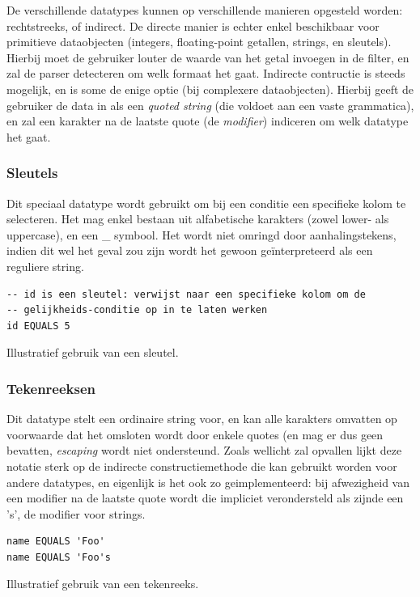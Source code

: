 De verschillende datatypes kunnen op verschillende manieren opgesteld worden: rechtstreeks, of indirect. De directe manier is echter enkel beschikbaar voor primitieve dataobjecten (integers, floating-point getallen, strings, en sleutels). Hierbij moet de gebruiker louter de waarde van het getal invoegen in de filter, en zal de parser detecteren om welk formaat het gaat.
Indirecte contructie is steeds mogelijk, en is some de enige optie (bij complexere dataobjecten). Hierbij geeft de gebruiker de data in als een \emph{quoted string} (die voldoet aan een vaste grammatica), en zal een karakter na de laatste quote (de \emph{modifier}) indiceren om welk datatype het gaat.

\subsubsection{Sleutels}

Dit speciaal datatype wordt gebruikt om bij een conditie een specifieke kolom te selecteren. Het mag enkel bestaan uit alfabetische karakters (zowel lower- als uppercase), en een \_ symbool. Het wordt niet omringd door aanhalingstekens, indien dit wel het geval zou zijn wordt het gewoon ge\"interpreteerd als een reguliere string.

\begin{code}
\begin{verbatim}
-- id is een sleutel: verwijst naar een specifieke kolom om de
-- gelijkheids-conditie op in te laten werken
id EQUALS 5
\end{verbatim}
\caption{Illustratief gebruik van een sleutel.}
\end{code}

\subsubsection{Tekenreeksen}

Dit datatype stelt een ordinaire string voor, en kan alle karakters omvatten op voorwaarde dat het omsloten wordt door enkele quotes (en mag er dus geen bevatten, \emph{escaping} wordt niet ondersteund. Zoals wellicht zal opvallen lijkt deze notatie sterk op de indirecte constructiemethode die kan gebruikt worden voor andere datatypes, en eigenlijk is het ook zo geimplementeerd: bij afwezigheid van een modifier na de laatste quote wordt die impliciet verondersteld als zijnde een 's', de modifier voor strings.

\begin{code}
\begin{verbatim}
name EQUALS 'Foo'
name EQUALS 'Foo's
\end{verbatim}
\caption{Illustratief gebruik van een tekenreeks.}
\end{code}

